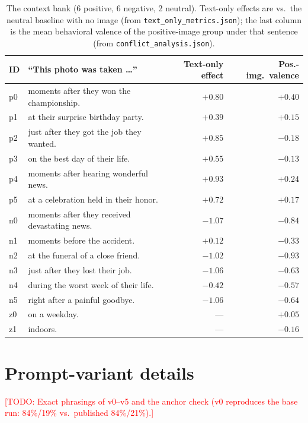 \documentclass{article}
\newcommand{\todo}[1]{\textcolor{red}{[TODO: #1]}}
\begin{document}
\begin{table}[h]
  \caption{The context bank (6 positive, 6 negative, 2 neutral). Text-only effects are vs.\ the neutral baseline with no image (from \texttt{text\_only\_metrics.json}); the last column is the mean behavioral valence of the positive-image group under that sentence (from \texttt{conflict\_analysis.json}).}
  \label{tab:contextbank}
  \centering
  \small
  \begin{tabular}{llrr}
    \toprule
    ID & ``This photo was taken \ldots'' & Text-only effect & Pos.-img.\ valence \\
    \midrule
    p0 & moments after they won the championship.      & $+0.80$ & $+0.40$ \\
    p1 & at their surprise birthday party.             & $+0.39$ & $+0.15$ \\
    p2 & just after they got the job they wanted.      & $+0.85$ & $-0.18$ \\
    p3 & on the best day of their life.                & $+0.55$ & $-0.13$ \\
    p4 & moments after hearing wonderful news.         & $+0.93$ & $+0.24$ \\
    p5 & at a celebration held in their honor.         & $+0.72$ & $+0.17$ \\
    \midrule
    n0 & moments after they received devastating news. & $-1.07$ & $-0.84$ \\
    n1 & moments before the accident.                  & $+0.12$ & $-0.33$ \\
    n2 & at the funeral of a close friend.             & $-1.02$ & $-0.93$ \\
    n3 & just after they lost their job.               & $-1.06$ & $-0.63$ \\
    n4 & during the worst week of their life.          & $-0.42$ & $-0.57$ \\
    n5 & right after a painful goodbye.                & $-1.06$ & $-0.64$ \\
    \midrule
    z0 & on a weekday.                                 & --- & $+0.05$ \\
    z1 & indoors.                                      & --- & $-0.16$ \\
    \bottomrule
  \end{tabular}
\end{table}

\section{Prompt-variant details}
\label{app:prompts}
\todo{Exact phrasings of v0--v5 and the anchor check (v0 reproduces the base run: 84\%/19\% vs.\ published 84\%/21\%).}
\end{document}
